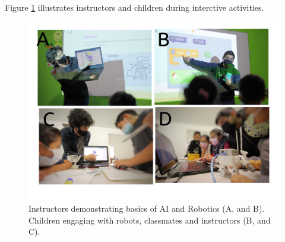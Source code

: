 \documentclass[conference]{IEEEtran}
\begin{document}
Figure \ref{fig:pilot} illustrates instructors and children during interctive activities. 
\begin{figure}[htbp]
    \centerline{\includegraphics[width=\linewidth]{piloting-workshops/versions/drawing-v00.png}}
    \caption{
        Instructors demonstrating basics of AI and Robotics (A, and B). 
        Children engaging with robots, classmates and instructors (B, and C).
        }
    \label{fig:pilot}
\end{figure}


    


\end{document}
